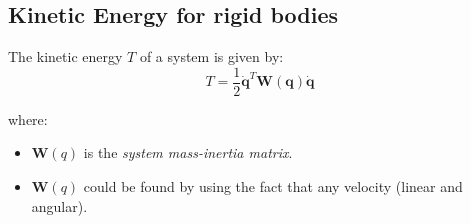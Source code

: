 \subsection{Kinetic Energy for rigid bodies}

The kinetic energy \( T \) of a system is given by:
\[
T = \frac{1}{2} \dot{\mathbf{q}}^T \mathbf{W(q) \dot{q}} \tag{2}
\]

where:
\begin{itemize}
  \item \(\mathbf{W}(q)\) is the \textit{system mass-inertia matrix}.
  \item \(\mathbf{W}(q)\) could be found by using the fact that any velocity (linear and angular).
\end{itemize}
